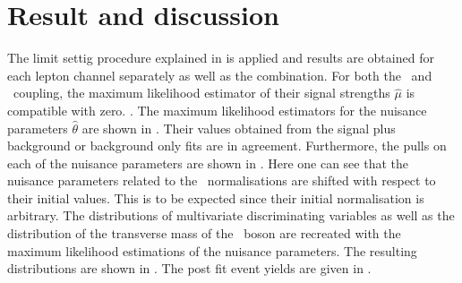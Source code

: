 \begin{comment}

\end{comment}


\section{Result and discussion}
The limit settig procedure explained in  is applied and results are obtained for each lepton channel separately as well as the combination. For both the \Zut\ and \Zct\ coupling, the maximum likelihood estimator of their signal strengths $\hat{\mu}$ is compatible with zero. . The maximum likelihood estimators for the nuisance parameters $\hat{\theta}$ are shown in . Their values obtained from the signal plus background or background only fits are in agreement. Furthermore, the pulls on each of the nuisance parameters are shown in . Here one can see that the nuisance parameters related to the \NPL\ normalisations are shifted with respect to their initial values. This is to be expected since their initial  normalisation is arbitrary. The distributions of multivariate discriminating  variables as well as the distribution of the transverse mass of the \PW\ boson are recreated with the maximum likelihood estimations of the nuisance parameters. The resulting distributions are shown in . The post fit event yields are given in . 

